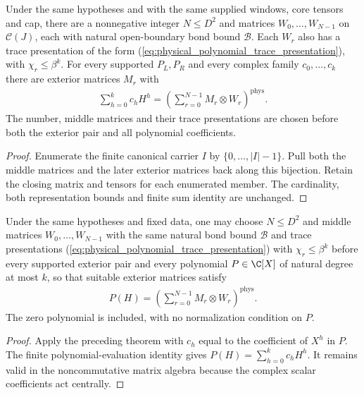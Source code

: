 \begin{lemma}
    \label{thm:physical_polynomial_fin_middle_family}
    \leanok
    Under the same hypotheses and with the same supplied windows, core tensors
    and cap, there are a nonnegative integer $N\le D^2$ and matrices
    $W_0,\ldots,W_{N-1}$ on $\mathcal C(J)$, each with natural open-boundary
    bond bound $\mathcal B$. Each $W_r$ also has a trace presentation of the
    form (\ref{eq:physical_polynomial_trace_presentation}), with
    $\chi_r\le\beta^k$. For every supported $P_L,P_R$ and every
    complex family $c_0,\ldots,c_k$ there are exterior matrices $M_r$ with
    \begin{align}
        \sum_{h=0}^{k}c_hH^h
        =\left(\sum_{r=0}^{N-1}M_r\otimes W_r\right)^{\mathrm{phys}}.
        \label{eq:physical_polynomial_fin_decomposition}
    \end{align}
    The number, middle matrices and their trace presentations are chosen
    before both the exterior pair and all polynomial coefficients.
\end{lemma}
\begin{proof}\leanok
    Enumerate the finite canonical carrier $I$ by
    $\{0,\ldots,|I|-1\}$. Pull both the middle matrices and the later exterior
    matrices back along this bijection. Retain the closing matrix and tensors
    for each enumerated member. The cardinality, both representation bounds
    and finite sum identity are unchanged.
\end{proof}

\begin{lemma}
    \label{thm:physical_aeval_fin_middle_family}
    \leanok
    Under the same hypotheses and fixed data, one may choose $N\le D^2$ and
    middle matrices $W_0,\ldots,W_{N-1}$ with the same natural bond bound
    $\mathcal B$ and trace presentations
    (\ref{eq:physical_polynomial_trace_presentation}) with $\chi_r\le\beta^k$
    before every supported exterior pair and every polynomial
    $P\in\C[X]$ of natural degree at most $k$, so that suitable exterior
    matrices satisfy
    \begin{align}
        P(H)=\left(\sum_{r=0}^{N-1}M_r\otimes W_r\right)^{\mathrm{phys}}.
        \label{eq:physical_aeval_fin_decomposition}
    \end{align}
    The zero polynomial is included, with no normalization condition on $P$.
\end{lemma}
\begin{proof}\leanok
    Apply the preceding theorem with $c_h$ equal to the coefficient of $X^h$
    in $P$. The finite polynomial-evaluation identity gives
    $P(H)=\sum_{h=0}^{k}c_hH^h$. It remains valid in the noncommutative matrix
    algebra because the complex scalar coefficients act centrally.
\end{proof}
